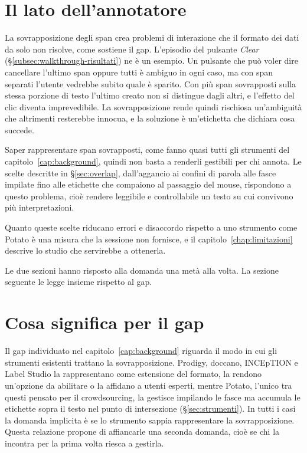 \documentclass[]{sapthesis}
\begin{document}
\section{Il lato dell'annotatore}
\label{sec:disc-annotatore}

La sovrapposizione degli span crea problemi di interazione che il formato dei dati da solo non risolve, come sostiene il gap. L'episodio del pulsante \emph{Clear} (\S\ref{subsec:walkthrough-risultati}) ne è un esempio. Un pulsante che può voler dire cancellare l'ultimo span oppure tutti è ambiguo in ogni caso, ma con span separati l'utente vedrebbe subito quale è sparito. Con più span sovrapposti sulla stessa porzione di testo l'ultimo creato non si distingue dagli altri, e l'effetto del clic diventa imprevedibile. La sovrapposizione rende quindi rischiosa un'ambiguità che altrimenti resterebbe innocua, e la soluzione è un'etichetta che dichiara cosa succede.

Saper rappresentare span sovrapposti, come fanno quasi tutti gli strumenti del capitolo~\ref{cap:background}, quindi non basta a renderli gestibili per chi annota. Le scelte descritte in \S\ref{sec:overlap}, dall'aggancio ai confini di parola alle fasce impilate fino alle etichette che compaiono al passaggio del mouse, rispondono a questo problema, cioè rendere leggibile e controllabile un testo su cui convivono più interpretazioni.

Quanto queste scelte riducano errori e disaccordo rispetto a uno strumento come Potato è una misura che la sessione non fornisce, e il capitolo~\ref{chap:limitazioni} descrive lo studio che servirebbe a ottenerla.

Le due sezioni hanno risposto alla domanda una metà alla volta. La sezione seguente le legge insieme rispetto al gap.

\section{Cosa significa per il gap}
\label{sec:disc-gap}

Il gap individuato nel capitolo~\ref{cap:background} riguarda il modo in cui gli strumenti esistenti trattano la sovrapposizione. Prodigy, doccano, INCEpTION e Label Studio la rappresentano come estensione del formato, la rendono un'opzione da abilitare o la affidano a utenti esperti, mentre Potato, l'unico tra questi pensato per il crowdsourcing, la gestisce impilando le fasce ma accumula le etichette sopra il testo nel punto di intersezione (\S\ref{sec:strumenti}). In tutti i casi la domanda implicita è se lo strumento sappia rappresentare la sovrapposizione. Questa relazione propone di affiancarle una seconda domanda, cioè se chi la incontra per la prima volta riesca a gestirla.
\end{document}
